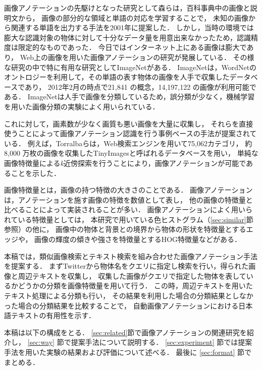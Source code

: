 画像アノテーションの先駆けとなった研究として森ら\cite{mori}は，百科事典中の画像と説明文から，
画像の部分的な領域と単語の対応を学習することで，
未知の画像から関連する単語を出力する手法を2001年に提案した．
しかし，当時の環境では膨大な認識対象の物体に対して十分なデータ量を用意出来なかったため，認識精度は限定的なものであった．
今日ではインターネット上にある画像は膨大であり，
Web上の画像を用いた画像アノテーションの研究が発展している．
その様な研究の中で特に有用な研究としてImageNet\cite{imagenet}がある．
ImageNet\cite{imagenet}は，WordNetのオントロジーを利用して，その単語の表す物体の画像を人手で収集したデータベースであり，
2012年2月の時点で21,841 の概念，14,197,122 の画像が利用可能である．
ImageNetは人手で画像を分類しているため，誤分類が少なく，機械学習を用いた画像分類の実験によく用いられている． 

これに対して，画素数が少なく画質も悪い画像を大量に収集し，
それらを直接使うことによって画像アノテーション認識を行う事例ベースの手法が提案されている．
例えば，Torralba\cite{torralba}らは，Web検索エンジンを用いて75,062カテゴリ，
約8,000 万枚の画像を収集したTinyImagesと呼ばれるデータベースを用い，
単純な画像特徴量による{\it k}近傍探索を行うことにより，画像アノテーションが可能であることを示した．

画像特徴量とは，画像の持つ特徴の大きさのことである．
画像アノテーションは，アノテーションを施す画像の特徴を数値として表し，
他の画像の特徴量と比べることによって実装されることが多い．
画像アノテーションによく用いられている特徴量としては，
本研究で用いている色ヒストグラム（\ref{sec:similar}節参照）の他に，
画像中の物体と背景との境界から物体の形状を特徴量とするエッジや，
画像の輝度の傾きや強さを特徴量とするHOG特徴量\cite{dalal}などがある．

本稿では，類似画像検索とテキスト検索を組み合わせた画像アノテーション手法を提案する．
まずTwitterから物体名をクエリに指定し検索を行い，得られた画像と周辺テキストを収集し，
収集した画像がクエリで指定した物体を表しているかどうかの分類を画像特徴量を用いて行う．
この時，周辺テキストを用いたテキスト処理による分類も行い，
その結果を利用した場合の分類結果としなかった場合の分類結果を比較することで，
自動画像アノテーションにおける日本語テキストの有用性を示す．


本稿は以下の構成をとる．
\ref{sec:related}節で画像アノテーションの関連研究を紹介し，
\ref{sec:way}
節で提案手法について説明する．
\ref{sec:experiment}
節では提案手法を用いた実験の結果および評価について述べる．
最後に
\ref{sec:format}
節でまとめる．

